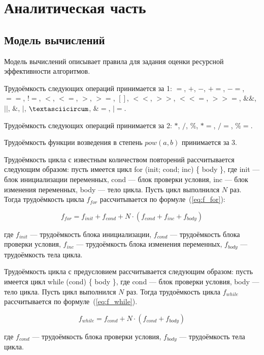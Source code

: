 \chapter{Аналитическая часть}

\section{Модель вычислений}

Модель вычислений описывает правила для задания оценки ресурсной эффективности алгоритмов.

Трудоёмкость следующих операций принимается за 1: $=$, $+$, $-$, $+=$, $-=$, $==$, $!=$, $<$, $<=$, $>$, $>=$, $[]$, $<<$, $>>$, $<<=$, $>>=$, $\&\&$, $||$, $\&$, $|$, $\textasciicircum$, $\&=$, $|=$. 

Трудоёмкость следующих операций принимается за 2: $*$, $/$, $\%$, $*=$, $/=$, $\%=$. 

Трудоёмкость функции возведения в степень $pow(a, b)$ принимается за 3.

Трудоёмкость цикла с известным количеством повторений рассчитывается следующим образом: пусть имеется цикл for (init; cond; inc) \{ body \}, где init --- блок инициализации переменных, cond --- блок проверки условия, inc --- блок изменения переменных, body --- тело цикла. Пусть цикл выполнился $N$ раз. Тогда трудоёмкость цикла $f_{for}$ рассчитывается по формуле~(\ref{eq:f_for}):

\begin{equation}
	\label{eq:f_for}
	f_{for} = f_{init} + f_{cond} + N \cdot (f_{cond} + f_{inc} + f_{body})
\end{equation}

где $f_{init}$ --- трудоёмкость блока инициализации, $f_{cond}$ --- трудоёмкость блока проверки условия, $f_{inc}$ --- трудоёмкость блока изменения переменных, $ f_{body}$ --- трудоёмкость тела цикла.

Трудоёмкость цикла с предусловием рассчитывается следующим образом: пусть имеется цикл while (cond) \{ body \}, где cond --- блок проверки условия,  body --- тело цикла. Пусть цикл выполнился $N$ раз. Тогда трудоёмкость цикла $f_{while}$ рассчитывается по формуле~(\ref{eq:f_while}).

\begin{equation}
	\label{eq:f_while}
	f_{while} = f_{cond} + N \cdot (f_{cond} + f_{body})
\end{equation}

где $f_{cond}$ --- трудоёмкость блока проверки условия, $ f_{body}$ --- трудоёмкость тела цикла.

